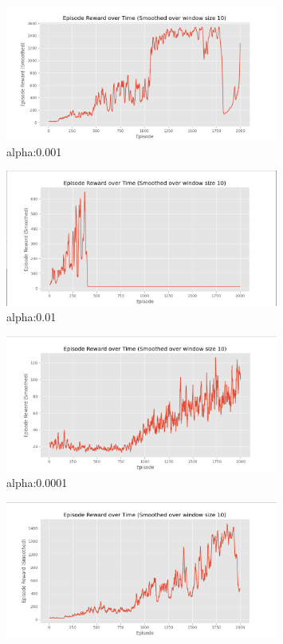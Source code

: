 \documentclass[a4paper]{article}
\theoremstyle{definition}
\newenvironment{soln}{
    \leavevmode\color{blue}\ignorespaces
}{}
\begin{document}
\begin{enumerate}
\begin{soln}
    \begin{figure}[H]
        \centering
        \includegraphics[width=0.8\textwidth]{images/alpha0.001.png}
        \caption{alpha:0.001}
    \end{figure}
    \begin{figure}[H]
        \centering
        \includegraphics[width=0.8\textwidth]{images/alpha0.01.png}
        \caption{alpha:0.01}
    \end{figure}
    \begin{figure}[H]
        \centering
        \includegraphics[width=0.8\textwidth]{images/alpha0.0001.png}
        \caption{alpha:0.0001}
        \label{fig:a2c}
    \end{figure}
    \begin{figure}[H]
        \centering
        \includegraphics[width=0.8\textwidth]{images/alpha0.0005.png}

\end{figure}
\end{soln}
\end{enumerate}
\end{document}
